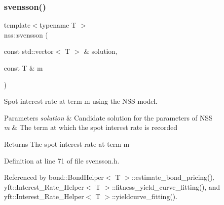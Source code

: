 \subsubsection{\texorpdfstring{svensson()}{svensson()}}
{\footnotesize\ttfamily template$<$typename T $>$ \\
nss\+::svensson (\begin{DoxyParamCaption}\item[{const std\+::vector$<$ T $>$ \&}]{solution,  }\item[{const T \&}]{m }\end{DoxyParamCaption})}



Spot interest rate at term m using the N\+SS model. 


\begin{DoxyParams}{Parameters}
{\em solution} & Candidate solution for the parameters of N\+SS \\
\hline
{\em m} & The term at which the spot interest rate is recorded \\
\hline
\end{DoxyParams}
\begin{DoxyReturn}{Returns}
The spot interest rate at term m 
\end{DoxyReturn}


Definition at line 71 of file svensson.\+h.



Referenced by bond\+::\+Bond\+Helper$<$ T $>$\+::estimate\+\_\+bond\+\_\+pricing(), yft\+::\+Interest\+\_\+\+Rate\+\_\+\+Helper$<$ T $>$\+::fitness\+\_\+yield\+\_\+curve\+\_\+fitting(), and yft\+::\+Interest\+\_\+\+Rate\+\_\+\+Helper$<$ T $>$\+::yieldcurve\+\_\+fitting().


